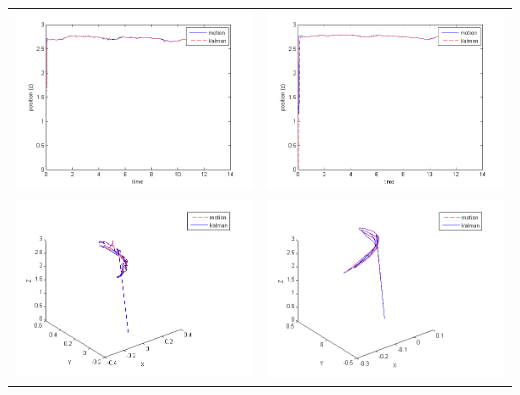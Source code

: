 \begin{center}
\begin{tabular}{cc}
        \includegraphics[width=.5\textwidth, height = 0.23\textheight, keepaspectratio]{fig/filter0-z.png} & \includegraphics[width=.5\textwidth, height = 0.23\textheight, keepaspectratio]{fig/filter3-z.png}\\
        \includegraphics[width=.5\textwidth, height = 0.23\textheight, keepaspectratio]{fig/filter0-xyz.png} & \includegraphics[width=.5\textwidth, height = 0.23\textheight, keepaspectratio]{fig/filter3-xyz.png}
    \end{tabular}
    \label{tab:no-filter-filter-kalman}
\end{center}

